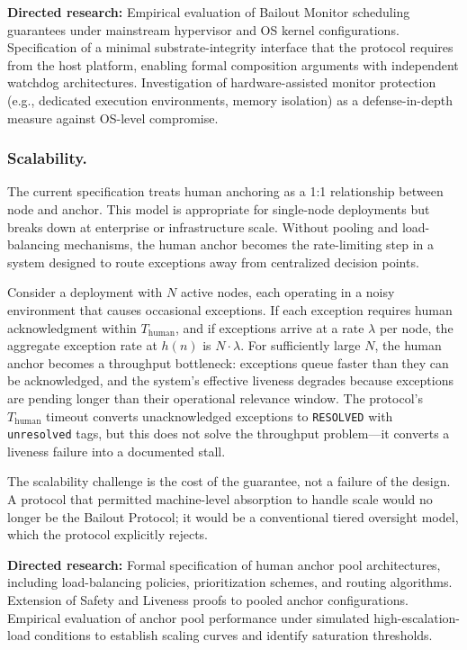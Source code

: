 \medskip\noindent\textbf{Directed research:} Empirical evaluation of Bailout Monitor scheduling guarantees under mainstream hypervisor and OS kernel configurations. Specification of a minimal substrate-integrity interface that the protocol requires from the host platform, enabling formal composition arguments with independent watchdog architectures. Investigation of hardware-assisted monitor protection (e.g., dedicated execution environments, memory isolation) as a defense-in-depth measure against OS-level compromise.

\subsubsection{Scalability.}
The current specification treats human anchoring as a 1:1 relationship between node and anchor. This model is appropriate for single-node deployments but breaks down at enterprise or infrastructure scale. Without pooling and load-balancing mechanisms, the human anchor becomes the rate-limiting step in a system designed to route exceptions away from centralized decision points.

Consider a deployment with $N$ active nodes, each operating in a noisy environment that causes occasional exceptions. If each exception requires human acknowledgment within $T_{\mathrm{human}}$, and if exceptions arrive at a rate $\lambda$ per node, the aggregate exception rate at $h(n)$ is $N \cdot \lambda$. For sufficiently large $N$, the human anchor becomes a throughput bottleneck: exceptions queue faster than they can be acknowledged, and the system's effective liveness degrades because exceptions are pending longer than their operational relevance window. The protocol's $T_{\mathrm{human}}$ timeout converts unacknowledged exceptions to \texttt{RESOLVED} with \texttt{unresolved} tags, but this does not solve the throughput problem---it converts a liveness failure into a documented stall.

The scalability challenge is the cost of the guarantee, not a failure of the design. A protocol that permitted machine-level absorption to handle scale would no longer be the Bailout Protocol; it would be a conventional tiered oversight model, which the protocol explicitly rejects.

\medskip\noindent\textbf{Directed research:} Formal specification of human anchor pool architectures, including load-balancing policies, prioritization schemes, and routing algorithms. Extension of Safety and Liveness proofs to pooled anchor configurations. Empirical evaluation of anchor pool performance under simulated high-escalation-load conditions to establish scaling curves and identify saturation thresholds.

